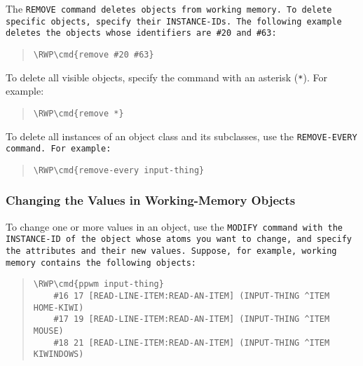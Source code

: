 The \tt{REMOVE} command deletes objects from working memory. To delete
specific objects, specify their \tt{INSTANCE-ID}s. The following
example deletes the objects whose identifiers are \verb|#20| and
\verb|#63|:

\begin{quote}
\begin{Verbatim}[commandchars=\\\{\}]
\RWP\cmd{remove #20 #63}
\end{Verbatim}
\end{quote}

To delete all visible objects, specify the command with an asterisk
(\verb|*|). For example:

\begin{quote}
\begin{Verbatim}[commandchars=\\\{\}]
\RWP\cmd{remove *}
\end{Verbatim}
\end{quote}

To delete all instances of an object class and its subclasses, use the
\tt{REMOVE-EVERY} command. For example:

\begin{quote}
\begin{Verbatim}[commandchars=\\\{\}]
\RWP\cmd{remove-every input-thing}
\end{Verbatim}
\end{quote}

\subsubsection{Changing the Values in Working-Memory Objects}

To change one or more values in an object, use the \tt{MODIFY} command with
the \tt{INSTANCE-ID} of the object whose atoms you want to change, and
specify the attributes and their new values.  Suppose, for example,
working memory contains the following objects:

\begin{quote}
\begin{Verbatim}[commandchars=\\\{\}]
\RWP\cmd{ppwm input-thing}
    #16 17 [READ-LINE-ITEM:READ-AN-ITEM] (INPUT-THING ^ITEM HOME-KIWI)
    #17 19 [READ-LINE-ITEM:READ-AN-ITEM] (INPUT-THING ^ITEM MOUSE)
    #18 21 [READ-LINE-ITEM:READ-AN-ITEM] (INPUT-THING ^ITEM KIWINDOWS)
\end{Verbatim}
\end{quote}

